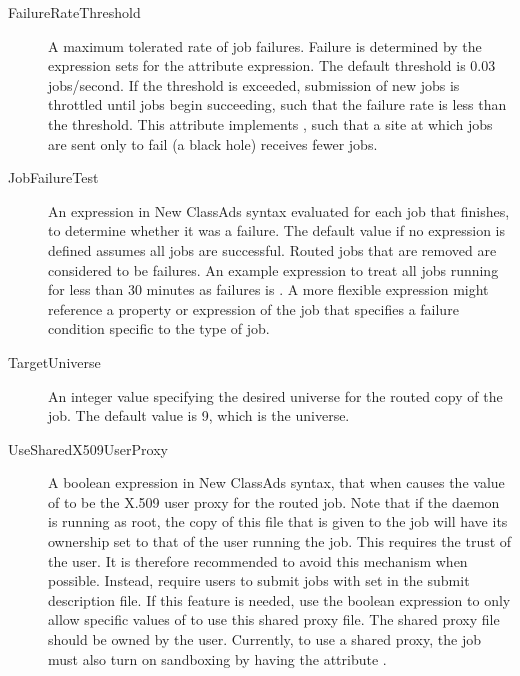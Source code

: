 \begin{description}
\item[FailureRateThreshold] A maximum tolerated rate of job failures.
Failure is determined by the expression sets for 
the attribute  expression.
The default threshold is 0.03 jobs/second.
If the threshold is exceeded,
submission of new jobs is throttled until jobs begin succeeding,
such that the failure rate is less than the threshold.
This attribute implements ,
such that a site at which jobs are sent only to fail (a black hole)
receives fewer jobs.

\item[JobFailureTest] An expression in New ClassAds syntax
evaluated for each job that finishes,
to determine whether it was a failure.
The default value if no expression is defined
assumes all jobs are successful.
Routed jobs that are removed are considered to be failures.
An example expression to treat all jobs running for less than 30 minutes as
failures is .  A more flexible
expression might reference a property or expression of the job that
specifies a failure condition specific to the type of job.

\item[TargetUniverse] An integer value specifying the desired
universe for the routed copy of the job.  The default value is 9, 
which is the  universe.

\item[UseSharedX509UserProxy] A boolean expression in New ClassAds syntax,
that when  causes the value of 
to be the X.509 user proxy for the routed job.
Note that if the  daemon is running as root,
the copy of this file that is given to the job
will have its ownership set to that of the user running the job.
This requires the trust of the user.
It is therefore recommended to avoid this mechanism when possible.
Instead,
require users to submit jobs with 
set in the submit description  file.
If this feature is needed,
use the boolean expression to only allow specific values of 
to use this shared proxy file.
The shared proxy file should be owned by the  user.
Currently, to use a shared proxy, the job must also
turn on sandboxing by having the attribute .


\end{description}
